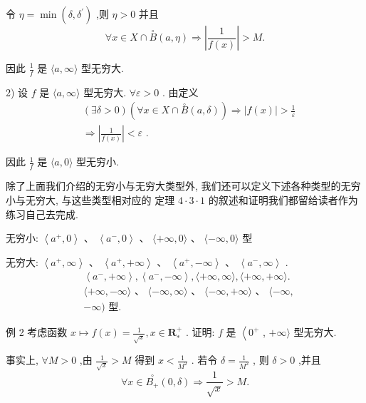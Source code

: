 令 $\eta  = \min \left( {\delta ,{\delta }^{\prime }}\right)$ ,则 $\eta  > 0$ 并且
$$\forall x \in  X \cap  \overset{ \circ  }{B}\left( {a,\eta }\right)  \Rightarrow  \left| \frac{1}{f\left( x\right) }\right|  > M.$$

因此 $\frac{1}{f}$ 是 $\langle a,\infty \rangle$ 型无穷大.

2) 设 $f$ 是 $\langle a,\infty \rangle$ 型无穷大. $\forall \varepsilon  > 0$ . 由定义
\begin{align*}
	&\left( {\exists \delta  > 0}\right) \left( {\forall x \in  X \cap  \overset{ \circ  }{B}\left( {a,\delta }\right) }\right)  \Rightarrow  \left| {f\left( x\right) }\right|  > \frac{1}{\varepsilon }\\
	&\Rightarrow  \left| \frac{1}{f\left( x\right) }\right|  < \varepsilon \text{ . }
\end{align*}

因此 $\frac{1}{f}$ 是 $\langle a,0\rangle$ 型无穷小.

除了上面我们介绍的无穷小与无穷大类型外, 我们还可以定义下述各种类型的无穷小与无穷大, 与这些类型相对应的 定理 $4 \cdot  3 \cdot  1$ 的叙述和证明我们都留给读者作为练习自己去完成.

无穷小: $\left\langle  {{a}^{ + },0}\right\rangle  \text{ 、 }\left\langle  {{a}^{ - },0}\right\rangle  \text{ 、 }\langle  + \infty ,0\rangle \text{ 、 }\langle  - \infty ,0\rangle$ 型

无穷大: $\left\langle  {{a}^{ + },\infty }\right\rangle  \text{ 、 }\left\langle  {{a}^{ + }, + \infty }\right\rangle  \text{ 、 }\left\langle  {{a}^{ + }, - \infty }\right\rangle  \text{ 、 }\left\langle  {{a}^{ - },\infty }\right\rangle$ .
\begin{align*}
	&\left\langle  {{a}^{ - }, + \infty }\right\rangle  ,\left\langle  {{a}^{ - }, - \infty }\right\rangle  ,\langle  + \infty ,\infty \rangle ,\langle  + \infty , + \infty \rangle .\\
	&\langle  + \infty , - \infty \rangle \text{ 、 }\langle  - \infty ,\infty \rangle \text{ 、 }\langle  - \infty , + \infty \rangle \text{ 、 }\langle  - \infty ,\\
	&- \infty )\text{ 型. }
\end{align*}

例 2 考虑函数 $x \mapsto  f\left( x\right)  = \frac{1}{\sqrt{x}},x \in  {\mathbf{R}}_{ * }^{ + }$ . 证明: $f$ 是 $\left\langle  {0}^{ + }\right.$ , $+ \infty \rangle$ 型无穷大.

事实上, $\forall M > 0$ ,由 $\frac{1}{\sqrt{x}} > M$ 得到 $x < \frac{1}{{M}^{2}}$ . 若令 $\delta  = \frac{1}{{M}^{2}}$ , 则 $\delta  > 0$ ,并且
$$\forall x \in  \overset{ \circ  }{{B}_{ + }}\left( {0,\delta }\right)  \Rightarrow  \frac{1}{\sqrt{x}} > M.$$

